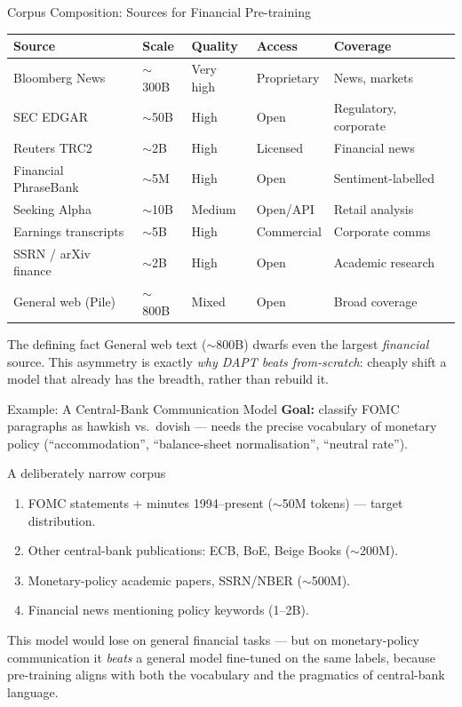 \documentclass[9pt,t]{beamer}
\begin{document}
\begin{frame}{Corpus Composition: Sources for Financial Pre-training}
\small
\setlength{\tabcolsep}{4pt}
\begin{tabular}{lllll}
\toprule
\textbf{Source} & \textbf{Scale} & \textbf{Quality} & \textbf{Access} & \textbf{Coverage} \\
\midrule
Bloomberg News      & $\sim$300B & Very high & Proprietary & News, markets \\
SEC EDGAR           & $\sim$50B  & High      & Open        & Regulatory, corporate \\
Reuters TRC2        & $\sim$2B   & High      & Licensed    & Financial news \\
Financial PhraseBank & $\sim$5M  & High      & Open        & Sentiment-labelled \\
Seeking Alpha       & $\sim$10B  & Medium    & Open/API    & Retail analysis \\
Earnings transcripts & $\sim$5B  & High      & Commercial  & Corporate comms \\
SSRN / arXiv finance & $\sim$2B  & High      & Open        & Academic research \\
General web (Pile)  & $\sim$800B & Mixed     & Open        & Broad coverage \\
\bottomrule
\end{tabular}

\medskip
\begin{block}{The defining fact}
General web text ($\sim$800B) dwarfs even the largest \emph{financial} source.
This asymmetry is exactly \emph{why DAPT beats from-scratch}: cheaply shift a model
that already has the breadth, rather than rebuild it.
\end{block}
\end{frame}

\begin{frame}{Example: A Central-Bank Communication Model}
\textbf{Goal:} classify FOMC paragraphs as hawkish vs.\ dovish --- needs the precise
vocabulary of monetary policy (``accommodation'', ``balance-sheet normalisation'',
``neutral rate'').

\medskip
\begin{block}{A deliberately narrow corpus}
\begin{enumerate}
  \item FOMC statements + minutes 1994--present ($\sim$50M tokens) --- target
        distribution.
  \item Other central-bank publications: ECB, BoE, Beige Books ($\sim$200M).
  \item Monetary-policy academic papers, SSRN/NBER ($\sim$500M).
  \item Financial news mentioning policy keywords (1--2B).
\end{enumerate}
\end{block}

\medskip
This model would lose on general financial tasks --- but on monetary-policy
communication it \emph{beats} a general model fine-tuned on the same labels,
because pre-training aligns with both the vocabulary and the pragmatics of
central-bank language.
\end{frame}
\end{document}
